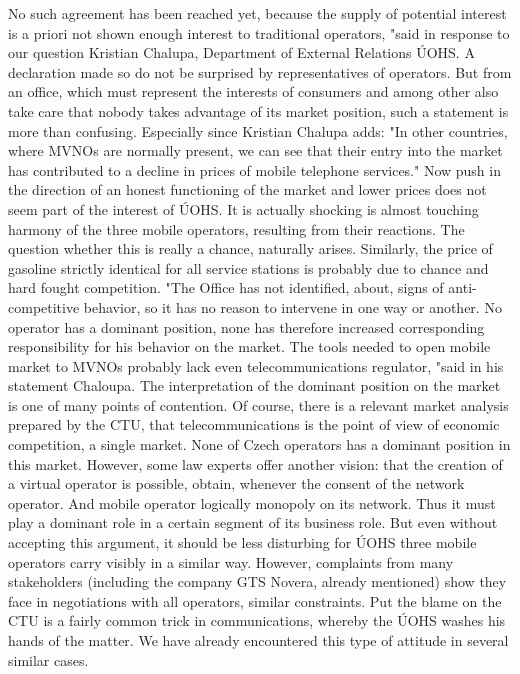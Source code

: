 No such agreement has been reached yet, because the supply of potential interest is a priori not shown enough interest to traditional operators, "said in response to our question Kristian Chalupa, Department of External Relations ÚOHS.
A declaration made so do not be surprised by representatives of operators.
But from an office, which must represent the interests of consumers and among other also take care that nobody takes advantage of its market position, such a statement is more than confusing.
Especially since Kristian Chalupa adds: "In other countries, where MVNOs are normally present, we can see that their entry into the market has contributed to a decline in prices of mobile telephone services."
Now push in the direction of an honest functioning of the market and lower prices does not seem part of the interest of ÚOHS.
It is actually shocking is almost touching harmony of the three mobile operators, resulting from their reactions.
The question whether this is really a chance, naturally arises.
Similarly, the price of gasoline strictly identical for all service stations is probably due to chance and hard fought competition.
"The Office has not identified, about, signs of anti-competitive behavior, so it has no reason to intervene in one way or another.
No operator has a dominant position, none has therefore increased corresponding responsibility for his behavior on the market.
The tools needed to open mobile market to MVNOs probably lack even telecommunications regulator, "said in his statement Chaloupa.
The interpretation of the dominant position on the market is one of many points of contention.
Of course, there is a relevant market analysis prepared by the CTU, that telecommunications is the point of view of economic competition, a single market.
None of Czech operators has a dominant position in this market.
However, some law experts offer another vision: that the creation of a virtual operator is possible, obtain, whenever the consent of the network operator.
And mobile operator logically monopoly on its network.
Thus it must play a dominant role in a certain segment of its business role.
But even without accepting this argument, it should be less disturbing for ÚOHS three mobile operators carry visibly in a similar way.
However, complaints from many stakeholders (including the company GTS Novera, already mentioned) show they face in negotiations with all operators, similar constraints.
Put the blame on the CTU is a fairly common trick in communications, whereby the ÚOHS washes his hands of the matter.
We have already encountered this type of attitude in several similar cases.
